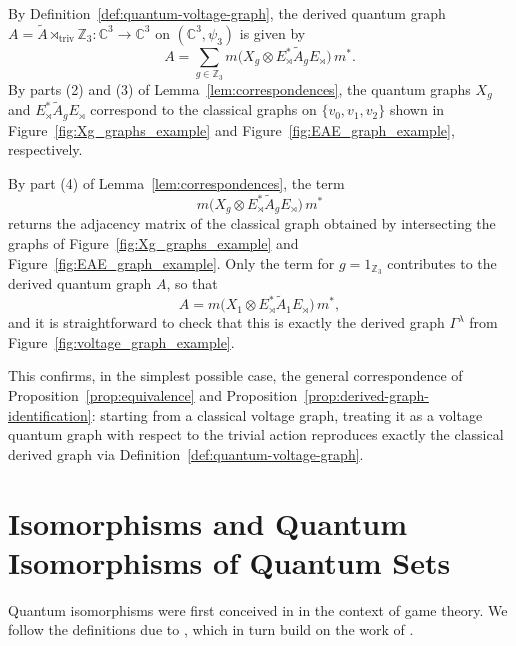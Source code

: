\begin{example}
    By Definition~\ref{def:quantum-voltage-graph}, the derived
    quantum graph \( A = \widetilde{A} \rtimes_{\mathrm{triv}} \mathbb{Z}_3
    \colon \mathbb{C}^3 \to \mathbb{C}^3 \) on \( (\mathbb{C}^3, \psi_3) \)
    is given by
    \[
        A = \sum_{g \in \mathbb{Z}_3} m\big( X_g \otimes E_\rtimes^*
        \widetilde{A}_g E_\rtimes \big)\, m^*.
    \]
    By parts (2) and (3) of
    Lemma~\ref{lem:correspondences},
    the quantum graphs \( X_g \) and
    \( E_\rtimes^* \widetilde{A}_g E_\rtimes \) correspond to the
    classical graphs on \( \{v_0,v_1,v_2\} \) shown in
    Figure~\ref{fig:Xg_graphs_example} and
    Figure~\ref{fig:EAE_graph_example}, respectively.

    

    

    By part (4) of
    Lemma~\ref{lem:correspondences}, the term
    \[
        m\big( X_g \otimes E_\rtimes^* \widetilde{A}_g E_\rtimes \big)\, m^*
    \]
    returns the adjacency matrix of the classical graph obtained by
    intersecting the graphs of
    Figure~\ref{fig:Xg_graphs_example} and
    Figure~\ref{fig:EAE_graph_example}. Only the term for
    \( g = 1_{\mathbb{Z}_3} \) contributes to the derived quantum
    graph \( A \), so that
    \[
        A = m\big( X_1 \otimes E_\rtimes^* \widetilde{A}_1 E_\rtimes
        \big)\, m^*,
    \]
    and it is straightforward to check that this is exactly the
    derived graph \( \Gamma^\lambda \) from
    Figure~\ref{fig:voltage_graph_example}.

    This confirms, in the simplest possible case, the general
    correspondence of
    Proposition~\ref{prop:equivalence} and
    Proposition~\ref{prop:derived-graph-identification}:
    starting from a classical voltage graph, treating it as a voltage
    quantum graph with respect to the trivial action reproduces exactly
    the classical derived graph via
    Definition~\ref{def:quantum-voltage-graph}.
\end{example}

\section{Isomorphisms and Quantum Isomorphisms of Quantum Sets}
\label{sec:quantum-isomorphisms}

Quantum isomorphisms were first conceived in \textcite{atserias16} in
the context of game theory. We follow the definitions due to
\textcite{tobolski26}, which in turn build on the work of
\textcite{musto18}.

